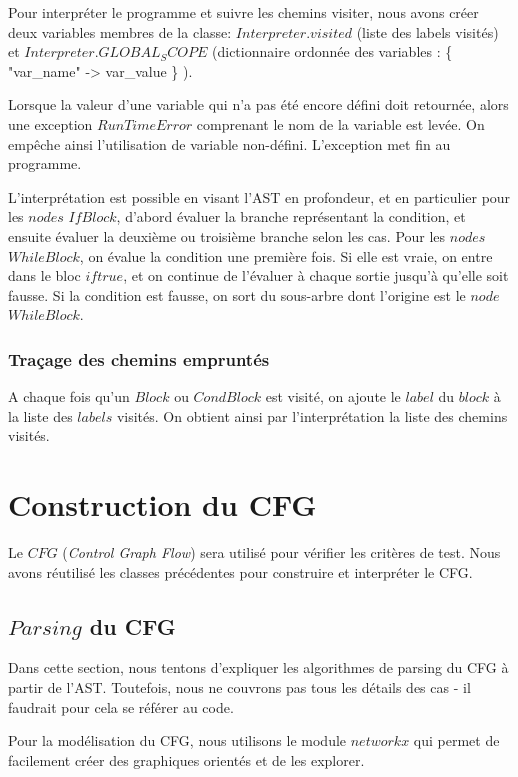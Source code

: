 \documentclass[a4paper]{article}
\begin{document}
Pour interpréter le programme et suivre les chemins visiter, nous avons créer deux variables membres de la classe: $Interpreter.visited$ (liste des labels visités) et $Interpreter.GLOBAL_SCOPE$ (dictionnaire ordonnée des variables : \{ "var\_name" -> var\_value \} ). 

Lorsque la valeur d'une variable qui n'a pas été encore défini doit retournée, alors une exception $RunTimeError$ comprenant le nom de la variable est levée. On empêche ainsi l'utilisation de variable non-défini. L'exception met fin au programme. 

L'interprétation est possible en visant l'AST en profondeur, et en particulier pour les $nodes$ $IfBlock$, d'abord évaluer la branche représentant la condition, et ensuite évaluer la deuxième ou troisième branche selon les cas. Pour les $nodes$ $WhileBlock$, on évalue la condition une première fois. Si elle est vraie, on entre dans le bloc $if true$, et on continue de l'évaluer à chaque sortie jusqu'à qu'elle soit fausse. Si la condition est fausse, on sort du sous-arbre dont l'origine est le $node$ $WhileBlock$. 

\subsubsection{Traçage des chemins empruntés}

A chaque fois qu'un $Block$ ou $CondBlock$ est visité, on ajoute le $label$ du $block$ à la liste des $labels$ visités. On obtient ainsi par l'interprétation la liste des chemins visités. 

\section{Construction du CFG}

Le $CFG$ (\textit{Control Graph Flow}) sera utilisé pour vérifier les critères de test. Nous avons réutilisé les classes précédentes pour construire et interpréter le CFG.

\subsection{$Parsing$ du CFG}

Dans cette section, nous tentons d'expliquer les algorithmes de parsing du CFG à partir de l'AST. Toutefois, nous ne couvrons pas tous les détails des cas - il faudrait pour cela se référer au code.

Pour la modélisation du CFG, nous utilisons le module $networkx$ qui permet de facilement créer des graphiques orientés et de les explorer. 
\end{document}
